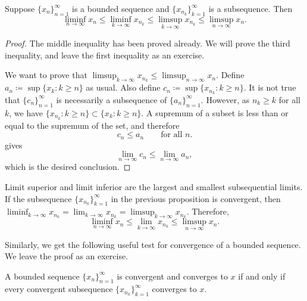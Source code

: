 \begin{prop} \label{prop:subseqslimsupinf}
Suppose $\{ x_n \}_{n=1}^\infty$ is a bounded sequence and
$\{ x_{n_k} \}_{k=1}^\infty$ is a subsequence.  Then
\begin{equation*}
\liminf_{n\to\infty} x_n \leq
\liminf_{k\to\infty} x_{n_k} \leq
\limsup_{k\to\infty} x_{n_k} \leq
\limsup_{n\to\infty} x_n .
\end{equation*}
\end{prop}

\begin{proof}
The middle inequality has been proved already.  We will prove the third
inequality, and leave the first inequality as an exercise.

We want to prove that
$\limsup_{k\to\infty} x_{n_k} \leq \limsup_{n\to\infty} x_n$.  Define
$a_n \coloneqq \sup \{ x_k : k \geq n \}$ 
as usual.
Also define
$c_n \coloneqq \sup \{ x_{n_k} : k \geq n \}$.
It is not true that $\{ c_n \}_{n=1}^\infty$ is necessarily a subsequence
of $\{ a_n \}_{n=1}^\infty$.
However, as $n_k \geq k$ for all $k$, we have
$\{ x_{n_k} : k \geq n \} \subset \{ x_k : k \geq n \}$.
A supremum of a subset is less than or equal to the supremum of the
set, and therefore
\begin{equation*}
c_n \leq a_n \qquad \text{for all $n$}.
\end{equation*}
 gives
\begin{equation*}
\lim_{n\to\infty} c_n \leq \lim_{n\to\infty} a_n ,
\end{equation*}
which is the desired conclusion.
\end{proof}

Limit superior and limit inferior
are the largest and smallest
subsequential limits.  If the subsequence $\{ x_{n_k} \}_{k=1}^\infty$ in the previous
proposition is convergent, then
$\liminf_{k\to\infty} x_{n_k} = \lim_{k\to\infty} x_{n_k} =
\limsup_{k\to\infty} x_{n_k}$.  Therefore,
\begin{equation*}
\liminf_{n\to\infty} x_n \leq
\lim_{k\to\infty} x_{n_k} \leq
\limsup_{n\to\infty} x_n .
\end{equation*}

Similarly, we get the following useful test for convergence
of a bounded sequence.  We leave the proof as an exercise.

\begin{prop} \label{seqconvsubseqconv:prop}
A bounded sequence $\{ x_n \}_{n=1}^\infty$ is convergent and converges to $x$
if and only if
every convergent subsequence
$\{ x_{n_k} \}_{k=1}^\infty$ converges to $x$.
\end{prop}

